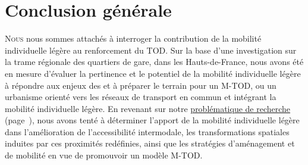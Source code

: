 \part*{Conclusion générale}
    \label{body:conclusion-generale}
    \begin{refsegment}

\lettrine[lines=3, findent=8pt, nindent=0pt]{ N}{ous} nous sommes attachés à interroger la contribution de la mobilité individuelle légère au renforcement du \acrshort{TOD}. Sur la base d'une investigation sur la trame régionale des quartiers de gare, dans les Hauts-de-France, nous avons été en mesure d'évaluer la pertinence et le potentiel de la mobilité individuelle légère à répondre aux enjeux des  et à préparer le terrain pour un \acrfull{M-TOD}, ou un urbanisme orienté vers les réseaux de transport en commun et intégrant la mobilité individuelle légère. En revenant sur notre \hyperref[introduction-generale:problematique-objectifs-hypotheses]{problématique de recherche} (page~\pageref{introduction-generale:problematique-objectifs-hypotheses}), nous avons tenté à déterminer l'apport de la mobilité individuelle légère dans l'amélioration de l'\gls{accessibilité intermodale}, les transformations spatiales induites par ces proximités redéfinies, ainsi que les stratégies d'aménagement et de mobilité en vue de promouvoir un modèle \acrshort{M-TOD}.


\end{refsegment}
